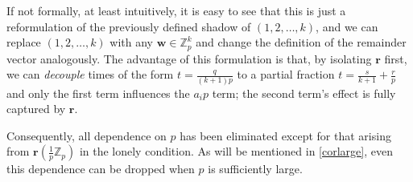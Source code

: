 \documentclass[11pt]{amsart}
\newcommand{\Int}[1]{\mathbb Z_{#1}}
\newcommand{\Zp}{\Int{p}}
\newcommand{\rbf}{\mathbf{r}}
\newcommand{\wbf}{\mathbf{w}}
\theoremstyle{definition}
\theoremstyle{remark}
\begin{document}
If not formally, at least intuitively, it is easy to see that this is just a reformulation of the previously
defined shadow of $(1,2,\ldots,k)$, and we can replace $(1,2,\ldots,k)$ with any $\wbf\in\Zp^k$ and change the definition
of the remainder vector analogously. The advantage of this formulation is that, by isolating $\rbf$ first, 
we can \emph{decouple} times of the form $t=\frac{q}{(k+1)p}$ to a partial fraction $t=\frac{s}{k+1}+\frac{r}{p}$ and only 
the first term influences the $a_ip$ term; the second term's effect is fully captured by $\rbf$. 

Consequently, all dependence on $p$ has been eliminated except for that arising from $\rbf(\frac{1}{p} \Zp)$
in the lonely condition. As will be mentioned in \ref{corlarge}, even this dependence can be dropped when $p$ 
is sufficiently large.
\end{document}
